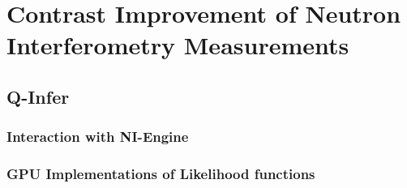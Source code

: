 \chapter{Contrast Improvement of Neutron Interferometry Measurements} %
\label{Chapter2}
\section{Q-Infer}
\subsection{Interaction with NI-Engine}
\subsection{GPU Implementations of Likelihood functions}